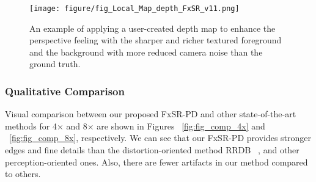 \documentclass{article}
\begin{document}
\begin{figure*}[!t]
\centering
\scriptsize
\begin{minipage}[t]{1.0\linewidth}
    \centering
    {\texttt{[image: figure/fig\_Local\_Map\_depth\_FxSR\_v11.png]}}\vfill
\end{minipage}
\caption{An example of applying a user-created depth map to enhance the perspective feeling with the sharper and richer textured foreground and the background with more reduced camera noise than the ground truth.}
\label{fig:fig_Local_Map3}
\end{figure*}

\subsubsection{Qualitative Comparison} 
Visual comparison between our proposed FxSR-PD and other state-of-the-art methods for 4$\times$ and 8$\times$ are shown in Figures ~\ref{fig:fig_comp_4x} and ~\ref{fig:fig_comp_8x}, respectively. 
We can see that our FxSR-PD provides stronger edges and fine details than the distortion-oriented method RRDB ~\cite{2018esrgan}, and other perception-oriented ones. Also, there are fewer artifacts in our method compared to others.
\end{document}

